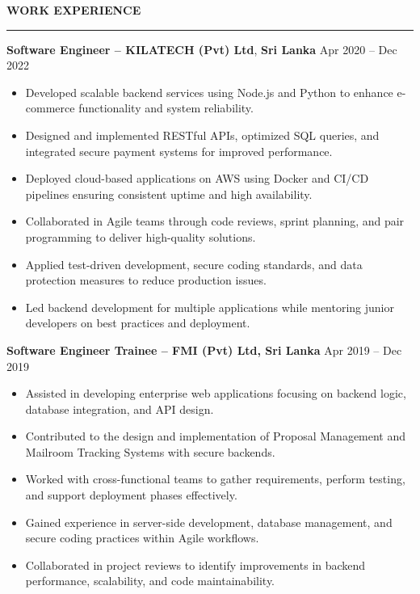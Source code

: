 \documentclass[10pt,letterpaper]{article}
\begin{document}
\vspace{8pt}

\textbf{WORK EXPERIENCE}\\[-8pt]
\noindent\rule{\textwidth}{1pt}

\vspace{-2pt}

\textbf{Software Engineer -- KILATECH (Pvt) Ltd}, \textbf{Sri Lanka} \hfill Apr 2020 -- Dec 2022

\vspace{-1pt}

\begin{itemize}
\item Developed scalable backend services using Node.js and Python to enhance e-commerce functionality and system reliability.
\item Designed and implemented RESTful APIs, optimized SQL queries, and integrated secure payment systems for improved performance.
\item Deployed cloud-based applications on AWS using Docker and CI/CD pipelines ensuring consistent uptime and high availability.
\item Collaborated in Agile teams through code reviews, sprint planning, and pair programming to deliver high-quality solutions.
\item Applied test-driven development, secure coding standards, and data protection measures to reduce production issues.
\item Led backend development for multiple applications while mentoring junior developers on best practices and deployment.
\end{itemize}

\textbf{Software Engineer Trainee -- FMI (Pvt) Ltd, Sri Lanka} \hfill Apr 2019 -- Dec 2019

\vspace{-1pt}

\begin{itemize}
\item Assisted in developing enterprise web applications focusing on backend logic, database integration, and API design.
\item Contributed to the design and implementation of Proposal Management and Mailroom Tracking Systems with secure backends.
\item Worked with cross-functional teams to gather requirements, perform testing, and support deployment phases effectively.
\item Gained experience in server-side development, database management, and secure coding practices within Agile workflows.
\item Collaborated in project reviews to identify improvements in backend performance, scalability, and code maintainability.
\end{itemize}
\end{document}
